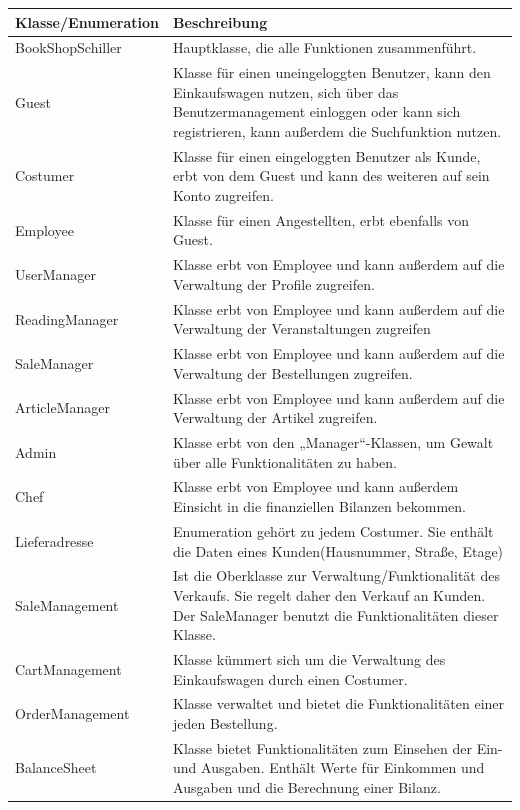 \documentclass[a4paper]{article}
\begin{document}
\begin{longtable}{|p{100px}|p{250px}|}
	\hline
	\rowcolor[HTML]{C0C0C0} 
	Klasse/Enumeration & Beschreibung \\ \hline
	BookShopSchiller & Hauptklasse, die alle Funktionen zusammenführt. \\ \hline
	Guest & Klasse für einen  uneingeloggten Benutzer, kann den Einkaufswagen nutzen, sich über das Benutzermanagement einloggen oder kann sich registrieren, kann außerdem die Suchfunktion nutzen. \\ \hline
	Costumer & Klasse für einen eingeloggten Benutzer als Kunde, erbt von dem Guest und kann des weiteren auf sein Konto zugreifen. \\ \hline
	Employee & Klasse für einen Angestellten, erbt ebenfalls von Guest.  \\ \hline
	UserManager & Klasse erbt von Employee und kann außerdem auf die Verwaltung der Profile zugreifen. \\ \hline
	ReadingManager & Klasse erbt von Employee und kann außerdem auf die Verwaltung der Veranstaltungen zugreifen \\ \hline
	SaleManager & Klasse erbt von Employee und kann außerdem auf die Verwaltung der Bestellungen zugreifen. \\ \hline
	ArticleManager & Klasse erbt von Employee und kann außerdem auf die Verwaltung der Artikel zugreifen. \\ \hline
	Admin & Klasse erbt von den „Manager“-Klassen, um Gewalt über alle Funktionalitäten zu haben. \\ \hline
	Chef & Klasse erbt von Employee und kann außerdem Einsicht in die finanziellen Bilanzen bekommen. \\ \hline
	Lieferadresse & Enumeration gehört zu jedem Costumer. Sie enthält die Daten eines Kunden(Hausnummer, Straße, Etage) \\ \hline
	SaleManagement & Ist die Oberklasse zur Verwaltung/Funktionalität des Verkaufs. Sie regelt daher den Verkauf an Kunden. Der SaleManager benutzt die Funktionalitäten dieser Klasse. \\ \hline
	CartManagement & Klasse kümmert sich um die Verwaltung des Einkaufswagen durch einen Costumer. \\ \hline
	OrderManagement & Klasse verwaltet und bietet die Funktionalitäten einer jeden Bestellung. \\ \hline
	BalanceSheet & Klasse bietet Funktionalitäten zum Einsehen der Ein- und Ausgaben. Enthält Werte für Einkommen und Ausgaben und die Berechnung einer Bilanz. \\ \hline

\end{longtable}
\end{document}
